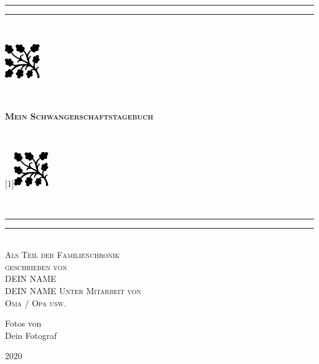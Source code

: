 {\begingroup
\centering
\vfill
\parbox{\textwidth}{%
\rule{\textwidth}{1.6pt}\vspace*{-\baselineskip}\vspace*{2pt} %
\rule{\textwidth}{0.4pt}\\[0.2\baselineskip] %
\parbox{\textwidth}{%
\parbox[c][1.5cm][c]{1.5cm}{\includegraphics[height=1.5cm]{tikz/19}}
~ \hrulefill ~
\parbox[c][2cm][c]{7cm}{\centering\textsc{\Large \textbf{Mein Schwangerschaftstagebuch}}}
 ~\hrulefill ~
\parbox[c][1.5cm][c]{1.5cm}{\scalebox{-1}[1]{\includegraphics[height=1.5cm]{tikz/19}}}}\\[0.2\baselineskip] %
\rule{\textwidth}{0.4pt}\vspace*{-\baselineskip}\vspace{3.2pt} %
\rule{\textwidth}{1.6pt}}\\[\baselineskip] %
\scshape %
Als Teil der Familienchronik \\[0.2\baselineskip] %

\vspace*{2\baselineskip} %
geschrieben von \\[0.5\baselineskip]
{\Large DEIN NAME}  \\
\Large
DEIN NAME %
\vfill
{Unter Mitarbeit von  \\ {Oma / Opa usw.}} %
\vfill \vfill
{Fotos von  \\ {Dein Fotograf}\par} %

\vfill %

{\scshape 2020} \\[0.3\baselineskip] %

\endgroup}
